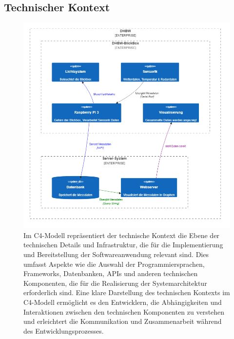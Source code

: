 \documentclass[
]{article}
\begin{document}
\subsection{Technischer Kontext}
\begin{figure}[H]
	\centering
	\includegraphics[width=125mm]{../c4/Technical_Context.png}
	\caption{Im C4-Modell repräsentiert der technische Kontext die Ebene der technischen Details und Infrastruktur, die für die Implementierung und Bereitstellung der Softwareanwendung relevant sind. Dies umfasst Aspekte wie die Auswahl der Programmiersprachen, Frameworks, Datenbanken, APIs und anderen technischen Komponenten, die für die Realisierung der Systemarchitektur erforderlich sind. Eine klare Darstellung des technischen Kontexts im C4-Modell ermöglicht es den Entwicklern, die Abhängigkeiten und Interaktionen zwischen den technischen Komponenten zu verstehen und erleichtert die Kommunikation und Zusammenarbeit während des Entwicklungsprozesses.}
	\label{fig:Kontextdiagramm}
\end{figure}  
\end{document}
